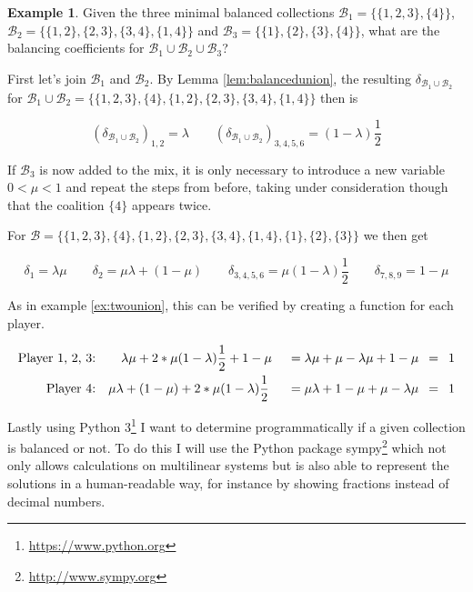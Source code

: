 \documentclass[10pt,a4paper,titlepage]{article}
\theoremstyle{plain}
\theoremstyle{definition}
\newtheorem{example}[thm]{Example} %
\begin{document}
\begin{example}
    Given the three minimal balanced collections $\mathcal{B}_1 = \{\{1, 2, 3\}, \{4\}\}$, $\mathcal{B}_2 = \{\{1, 2\}, \{2, 3\}, \{3, 4\}, \{1, 4\}\}$ and $\mathcal{B}_3 = \{\{1\}, \{2\}, \{3\}, \{4\}\}$, what are the balancing coefficients for $\mathcal{B}_1 \cup \mathcal{B}_2 \cup \mathcal{B}_3$?

    First let's join $\mathcal{B}_1$ and $\mathcal{B}_2$. By Lemma \ref{lem:balancedunion}, the resulting $\delta_{\mathcal{B}_1\cup\mathcal{B}_2}$ for $\mathcal{B}_1\cup\mathcal{B}_2 = \{\{1, 2, 3\}, \{4\}, \{1, 2\}, \{2, 3\}, \{3, 4\}, \{1, 4\}\}$ then is

    \begin{equation*}
        (\delta_{\mathcal{B}_1\cup\mathcal{B}_2})_{1, 2} = \lambda\qquad (\delta_{\mathcal{B}_1\cup\mathcal{B}_2})_{3, 4, 5, 6} = (1 - \lambda)\frac{1}{2}
    \end{equation*}

    If $\mathcal{B}_3$ is now added to the mix, it is only necessary to introduce a new variable $0 < \mu < 1$ and repeat the steps from before, taking under consideration though that the coalition $\{4\}$ appears twice.

    For $\mathcal{B} = \{\{1, 2, 3\}, \{4\}, \{1, 2\}, \{2, 3\}, \{3, 4\}, \{1, 4\}, \{1\}, \{2\}, \{3\}\}$ we then get

    \begin{equation*}
        \delta_1 = \lambda \mu\qquad \delta_2 = \mu \lambda + (1 - \mu)\qquad \delta_{3, 4, 5, 6} = \mu(1 - \lambda)\frac{1}{2}\qquad \delta_{7, 8, 9} = 1 - \mu
    \end{equation*}

    As in example \ref{ex:twounion}, this can be verified by creating a function for each player.

    \begin{alignat*}{3}
        \text{Player 1, 2, 3:} & \qquad \lambda\mu + 2 * \mu(1-\lambda)\frac{1}{2} + 1 - \mu &\enskip=\lambda\mu + \mu - \lambda\mu + 1 - \mu &\enskip=\enskip 1\\
        \text{Player 4:} & \quad \mu \lambda + (1 - \mu) + 2 * \mu(1-\lambda)\frac{1}{2} &\enskip= \mu\lambda + 1 - \mu + \mu - \lambda \mu &\enskip=\enskip 1
    \end{alignat*}
\end{example}

Lastly using Python 3\footnote{\url{https://www.python.org}} I want to determine programmatically if a given collection is balanced or not. To do this I will use the Python package sympy\footnote{\url{http://www.sympy.org}} which not only allows calculations on multilinear systems but is also able to represent the solutions in a human-readable way, for instance by showing fractions instead of decimal numbers.
\end{document}
